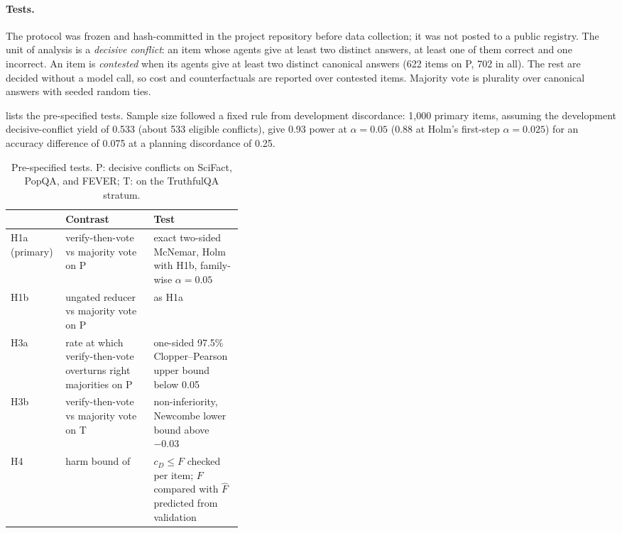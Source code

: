 \paragraph{Tests.} The protocol was frozen and hash-committed in the project repository before data collection; it was not posted to a public registry. The unit of analysis is a \emph{decisive conflict}: an item whose agents give at least two distinct answers, at least one of them correct and one incorrect. An item is \emph{contested} when its agents give at least two distinct canonical answers (622 items on P, 702 in all). The rest are decided without a model call, so cost and counterfactuals are reported over contested items. Majority vote is plurality over canonical answers with seeded random ties.

 lists the pre-specified tests. Sample size followed a fixed rule from development discordance: 1,000 primary items, assuming the development decisive-conflict yield of 0.533 (about 533 eligible conflicts), give 0.93 power at $\alpha = 0.05$ (0.88 at Holm's \citep{holm1979simple} first-step $\alpha = 0.025$) for an accuracy difference of 0.075 at a planning discordance of 0.25.

\begin{table}[t]
  \centering
  \caption{Pre-specified tests. P: decisive conflicts on SciFact, PopQA, and FEVER; T: on the TruthfulQA stratum.}
  \label{tab:hypotheses}
  \small
  \begin{tabularx}{\linewidth}{@{}l>{\raggedright\arraybackslash}p{0.38\linewidth}L@{}}
    \toprule
    & Contrast & Test \\
    \midrule
    H1a (primary) & verify-then-vote vs majority vote on P & exact two-sided McNemar, Holm with H1b, family-wise $\alpha = 0.05$ \\
    H1b & ungated reducer vs majority vote on P & as H1a \\
    H3a & rate at which verify-then-vote overturns right majorities on P & one-sided 97.5\% Clopper--Pearson \citep{clopper1934use} upper bound below 0.05 \\
    H3b & verify-then-vote vs majority vote on T & non-inferiority, Newcombe lower bound above $-0.03$ \\
    H4 & harm bound of  & $c_D \leq F$ checked per item; $F$ compared with $\hat F$ predicted from validation \\
    \bottomrule
  \end{tabularx}
\end{table}


